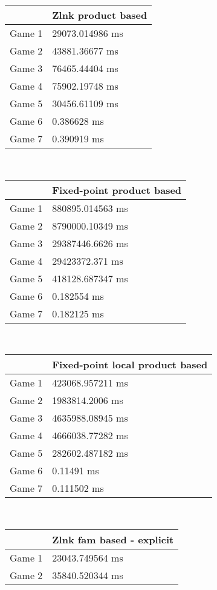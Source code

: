 \begin{multicols}{2}
\begin{tabular}{|l|l|}
	\hline
	& Zlnk product based \\ \hline
	Game 1 & 29073.014986 ms \\ \hline
	Game 2 & 43881.36677 ms \\ \hline
	Game 3 & 76465.44404 ms \\ \hline
	Game 4 & 75902.19748 ms \\ \hline
	Game 5 & 30456.61109 ms \\ \hline
	Game 6 & 0.386628 ms \\ \hline
	Game 7 & 0.390919 ms \\ \hline
\end{tabular}\\
\begin{tabular}{|l|l|}
	\hline
	& Fixed-point product based \\ \hline
	Game 1 & 880895.014563 ms \\ \hline
	Game 2 & 8790000.10349 ms \\ \hline
	Game 3 & 29387446.6626 ms \\ \hline
	Game 4 & 29423372.371 ms \\ \hline
	Game 5 & 418128.687347 ms \\ \hline
	Game 6 & 0.182554 ms \\ \hline
	Game 7 & 0.182125 ms \\ \hline
\end{tabular}\\
\begin{tabular}{|l|l|}
	\hline
	& Fixed-point local product based \\ \hline
	Game 1 & 423068.957211 ms \\ \hline
	Game 2 & 1983814.2006 ms \\ \hline
	Game 3 & 4635988.08945 ms \\ \hline
	Game 4 & 4666038.77282 ms \\ \hline
	Game 5 & 282602.487182 ms \\ \hline
	Game 6 & 0.11491 ms \\ \hline
	Game 7 & 0.111502 ms \\ \hline
\end{tabular}\\
\begin{tabular}{|l|l|}
	\hline
	& Zlnk fam based - explicit \\ \hline
	Game 1 & 23043.749564 ms \\ \hline
	Game 2 & 35840.520344 ms \\ \hline

\end{tabular}
\end{multicols}
